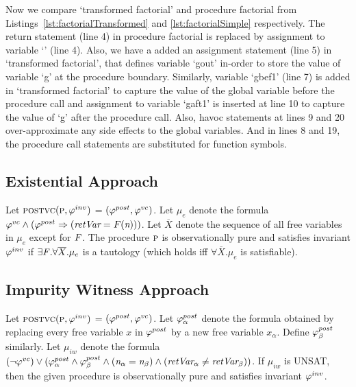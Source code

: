 
Now we compare `transformed factorial' and procedure factorial from
Listings~\ref{lst:factorialTransformed} and \ref{lst:factorialSimple}
respectively. The return statement (line 4) in procedure factorial
is replaced by assignment to variable `\retVar' (line 4). Also, we
have a added an assignment statement (line 5) in `transformed
factorial', that defines variable `gout' in-order to store the value
of variable `g' at the procedure boundary. Similarly, variable `gbef1'
(line 7) is added in `transformed factorial' to capture the value of
the global variable before the procedure call and assignment to
variable `gaft1' is inserted at line 10 to capture the value of `g'
after the procedure call. Also, havoc statements at lines 9 and 20
over-approximate any side effects to the global variables. And in
lines 8 and 19, the procedure call statements are substituted for
function symbols.


\subsection{Existential Approach}

Let $\textsc{postvc}({\textsc{p}},{\varphi^{inv}})$ = $(\varphi^{post},\varphi^{vc})$.
Let $\mu_e$ denote the formula $\varphi^{vc} \wedge (\varphi^{post} \Rightarrow (\textit{retVar} = \mathit{F}(\textit{n})))$.
Let $\overline{X}$ denote the sequence of all free variables in $\mu_e$ except for $\mathit{F}$.
The procedure $\textsc{p}$ is observationally pure and satisfies invariant $\varphi^{inv}$ if
$\exists \mathit{F}. \forall \overline{X}. \mu_e$ is a tautology (which holds iff
$\forall \overline{X}. \mu_e$ is satisfiable).

\subsection{Impurity Witness Approach}

Let $\textsc{postvc}({\textsc{p}},{\varphi^{inv}})$ = $(\varphi^{post},\varphi^{vc})$.
Let $\varphi^{post}_\alpha$ denote the formula obtained by replacing every free variable $x$ in $\varphi^{post}$
by a new free variable $x_\alpha$. Define $\varphi^{post}_\beta$ similarly.
Let $\mu_{iw}$ denote the formula $(\neg \varphi^{vc}) \vee (\varphi^{post}_\alpha \wedge \varphi^{post}_\beta \wedge (\textit{n}_\alpha = \textit{n}_\beta) \wedge (\textit{retVar}_\alpha \neq \textit{retVar}_\beta))$.
If $\mu_{iw}$ is UNSAT, then the given procedure is observationally pure and satisfies invariant $\varphi^{inv}$.